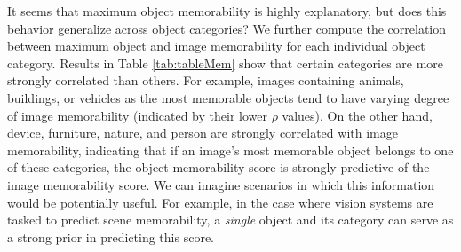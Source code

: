 It seems that maximum object memorability is highly explanatory, but does this behavior generalize across object categories? We further compute the correlation between maximum object and image memorability for each individual object category. Results in  Table \ref{tab:tableMem} show that certain categories are more strongly correlated than others. For example, images containing animals, buildings, or vehicles as the most memorable objects tend to have varying degree of image memorability (indicated by their lower $\rho$ values). On the other hand, device, furniture, nature, and person are strongly correlated with image memorability, indicating that if an image's most memorable object belongs to one of these categories, the object memorability score is strongly predictive of the image memorability score. We can imagine scenarios in which this information would be potentially useful. For example, in the case where vision systems are tasked to predict scene memorability, a \textit{single} object and its category can serve as a strong prior in predicting this score.

\begin{table}[t]
    \caption{\footnotesize\textbf{Max object memorability and image memorability.} add-in later. }\label{tab:tableMem}
\end{table}





